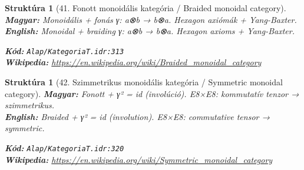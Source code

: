 \documentclass[11pt,a4paper,twocolumn]{article}
\newtheorem{struktura}[tetel]{Struktúra}
\begin{document}
\begin{struktura}[41. Fonott monoidális kategória / Braided monoidal category]

\textbf{Magyar:} Monoidális + fonás γ: a⊗b → b⊗a. Hexagon axiómák + Yang-Baxter.\\

\textbf{English:} Monoidal + braiding γ: a⊗b → b⊗a. Hexagon axioms + Yang-Baxter.\\

\begin{center}
\end{center}

\textbf{Kód:} \texttt{Alap/KategoriaT.idr:313}\\
\textbf{Wikipedia:} \url{https://en.wikipedia.org/wiki/Braided_monoidal_category}

\end{struktura}

\vspace{0.5cm}

\begin{struktura}[42. Szimmetrikus monoidális kategória / Symmetric monoidal category]

\textbf{Magyar:} Fonott + γ² = id (involúció). E8×E8: kommutatív tenzor → szimmetrikus.\\

\textbf{English:} Braided + γ² = id (involution). E8×E8: commutative tensor → symmetric.\\

\begin{center}
\end{center}

\textbf{Kód:} \texttt{Alap/KategoriaT.idr:320}\\
\textbf{Wikipedia:} \url{https://en.wikipedia.org/wiki/Symmetric_monoidal_category}

\end{struktura}

\vspace{0.5cm}
\end{document}
